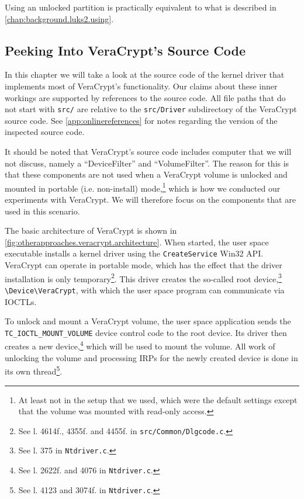 Using an unlocked partition is practically equivalent to what is described in \autoref{chap:background.luks2.using}.

\subsection{Peeking Into VeraCrypt's Source Code}
\label{chap:otherapproaches.veracrypt.peeking}
In this chapter we will take a look at the source code of the kernel driver that implements most of VeraCrypt's functionality. Our claims about these inner workings are supported by references to the source code. All file paths that do not start with \texttt{src/} are relative to the \texttt{src/Driver} subdirectory of the VeraCrypt source code. See \autoref{app:onlinereferences} for notes regarding the version of the inspected source code.

It should be noted that VeraCrypt's source code includes computer that we will not discuss, namely a ``DeviceFilter'' and ``VolumeFilter''. The reason for this is that these components are not used when a VeraCrypt volume is unlocked and mounted in portable (i.e. non-install) mode,\footnote{\label{fn:otherapproaches.veracrypt.othercomponents} At least not in the setup that we used, which were the default settings except that the volume was mounted with read-only access.} which is how we conducted our experiments with VeraCrypt. We will therefore focus on the components that are used in this scenario.

The basic architecture of VeraCrypt is shown in \autoref{fig:otherapproaches.veracrypt.architecture}. When started, the user space executable installs a kernel driver using the \texttt{CreateService} Win32 API. VeraCrypt can operate in portable mode, which has the effect that the driver installation is only temporary\footnote{\label{fn:otherapproaches.veracrypt.createservice} See l. 4614f., 4355f. and 4455f. in \texttt{src/Common/Dlgcode.c}.}. This driver creates the so-called root device,\footnote{\label{fn:otherapproaches.veracrypt.createroot} See l. 375 in \texttt{Ntdriver.c}.} \texttt{\textbackslash Device\textbackslash VeraCrypt}, with which the user space program can communicate via IOCTLs.

To unlock and mount a VeraCrypt volume, the user space application sends the \texttt{TC\_IOCTL\_MOUNT\_VOLUME} device control code to the root device. Its driver then creates a new device,\footnote{\label{fn:otherapproaches.veracrypt.createdevice} See l. 2622f. and 4076 in \texttt{Ntdriver.c}.} which will be used to mount the volume. All work of unlocking the volume and processing IRPs for the newly created device is done in its own thread\footnote{\label{fn:otherapproaches.veracrypt.volumethread} See l. 4123 and 3074f. in \texttt{Ntdriver.c}.}.

